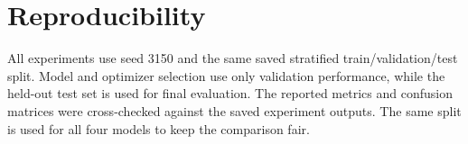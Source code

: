 \section{Reproducibility}
\label{app:evidence}
All experiments use seed 3150 and the same saved stratified
train/validation/test split. Model and optimizer selection use only validation
performance, while the held-out test set is used for final evaluation. The
reported metrics and confusion matrices were cross-checked against the saved
experiment outputs. The same split is used for all four models to keep the
comparison fair.
